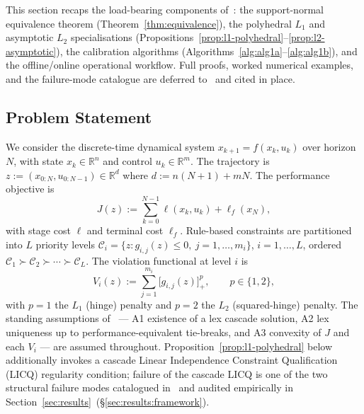 
This section recaps the load-bearing components of~\cite{lcp2025}: the support-normal equivalence theorem (Theorem~\ref{thm:equivalence}), the polyhedral $L_1$ and asymptotic $L_2$ specialisations (Propositions~\ref{prop:l1-polyhedral}--\ref{prop:l2-asymptotic}), the calibration algorithms (Algorithms~\ref{alg:alg1a}--\ref{alg:alg1b}), and the offline/online operational workflow. Full proofs, worked numerical examples, and the failure-mode catalogue are deferred to~\cite{lcp2025} and cited in place.

\subsection{Problem Statement}
\label{sec:foundations:problem}

We consider the discrete-time dynamical system $x_{k+1} = f(x_k, u_k)$ over horizon $N$, with state $x_k \in \mathbb{R}^n$ and control $u_k \in \mathbb{R}^m$. The trajectory is $z := (x_{0:N}, u_{0:N-1}) \in \mathbb{R}^d$ where $d := n(N+1) + mN$. The performance objective is
\begin{equation}
J(z) := \sum_{k=0}^{N-1} \ell(x_k, u_k) + \ell_f(x_N),
\label{eq:perf-objective}
\end{equation}
with stage cost $\ell$ and terminal cost $\ell_f$. Rule-based constraints are partitioned into $L$ priority levels $\mathcal{C}_i = \{z : g_{i,j}(z) \leq 0, \ j = 1, \ldots, m_i\}$, $i = 1, \ldots, L$, ordered $\mathcal{C}_1 \succ \mathcal{C}_2 \succ \cdots \succ \mathcal{C}_L$. The violation functional at level $i$ is
\begin{equation}
V_i(z) := \sum_{j=1}^{m_i} \bigl[g_{i,j}(z)\bigr]_{+}^{p}, \qquad p \in \{1, 2\},
\label{eq:violation-functional}
\end{equation}
with $p = 1$ the $L_1$ (hinge) penalty and $p = 2$ the $L_2$ (squared-hinge) penalty. The standing assumptions of~\cite{lcp2025} --- A1 existence of a lex cascade solution, A2 lex uniqueness up to performance-equivalent tie-breaks, and A3 convexity of $J$ and each $V_i$ --- are assumed throughout. Proposition~\ref{prop:l1-polyhedral} below additionally invokes a cascade Linear Independence Constraint Qualification (LICQ) regularity condition; failure of the cascade LICQ is one of the two structural failure modes catalogued in~\cite[\S8]{lcp2025} and audited empirically in Section~\ref{sec:results}~(\S\ref{sec:results:framework}).

